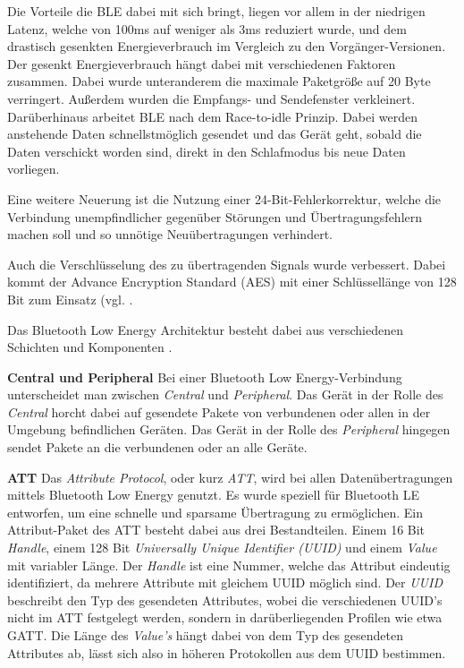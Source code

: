 Die Vorteile die BLE dabei mit sich bringt, liegen vor allem in der niedrigen Latenz, welche von 100ms auf weniger als 3ms reduziert wurde, und dem drastisch gesenkten Energieverbrauch im Vergleich zu den Vorgänger-Versionen. Der gesenkt Energieverbrauch hängt dabei mit verschiedenen Faktoren zusammen. 
Dabei wurde unteranderem die maximale Paketgröße auf 20 Byte verringert. Außerdem wurden die Empfangs- und Sendefenster verkleinert. 
Darüberhinaus arbeitet BLE nach dem Race-to-idle Prinzip. Dabei werden anstehende Daten schnellstmöglich gesendet und das Gerät geht, sobald die Daten verschickt worden sind, direkt in den Schlafmodus bis neue Daten vorliegen.

Eine weitere Neuerung ist die Nutzung einer 24-Bit-Fehlerkorrektur, welche die Verbindung unempfindlicher gegenüber Störungen und Übertragungsfehlern machen soll und so unnötige Neuübertragungen verhindert.

Auch die Verschlüsselung des zu übertragenden Signals wurde verbessert. Dabei kommt der Advance Encryption Standard (AES) mit einer Schlüssellänge von 128 Bit zum Einsatz (vgl. \cite{blespecs}. 

Das Bluetooth Low Energy Architektur besteht dabei aus verschiedenen Schichten und Komponenten \cite{blespecsnordic}.

\textbf{Central und Peripheral}
Bei einer Bluetooth Low Energy-Verbindung unterscheidet man zwischen \emph{Central} und \emph{Peripheral}. Das Gerät in der Rolle des \emph{Central} horcht dabei auf gesendete Pakete von verbundenen oder allen in der Umgebung befindlichen Geräten. Das Gerät in der Rolle des \emph{Peripheral} hingegen sendet Pakete an die verbundenen oder an alle Geräte.


\textbf{ATT}
Das \emph{Attribute Protocol}, oder kurz \emph{ATT}, wird bei allen Datenübertragungen mittels Bluetooth Low Energy genutzt. Es wurde speziell für Bluetooth LE entworfen, um eine schnelle und sparsame Übertragung zu ermöglichen. 
Ein Attribut-Paket des ATT besteht dabei aus drei Bestandteilen. Einem 16 Bit \emph{Handle}, einem 128 Bit \emph{Universally Unique Identifier (UUID)} und einem \emph{Value} mit variabler Länge.
Der \emph{Handle} ist eine Nummer, welche das Attribut eindeutig identifiziert, da mehrere Attribute mit gleichem UUID möglich sind.
Der \emph{UUID} beschreibt den Typ des gesendeten Attributes, wobei die verschiedenen UUID's nicht im ATT festgelegt werden, sondern in darüberliegenden Profilen wie etwa GATT.
Die Länge des \emph{Value's} hängt dabei von dem Typ des gesendeten Attributes ab, lässt sich also in höheren Protokollen aus dem UUID bestimmen.

